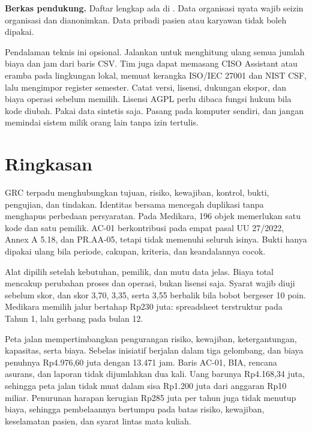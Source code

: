 \textbf{Berkas pendukung.} Daftar lengkap ada di . Data
organisasi nyata wajib seizin organisasi dan dianonimkan. Data pribadi pasien atau karyawan tidak
boleh dipakai.

\begin{pendalaman}
Pendalaman teknis ini opsional. Jalankan  untuk
menghitung ulang semua jumlah biaya dan jam dari baris CSV. Tim juga dapat memasang CISO Assistant
atau eramba pada lingkungan lokal, memuat kerangka ISO/IEC 27001 dan NIST CSF, lalu mengimpor
register semester. Catat versi, lisensi, dukungan ekspor, dan biaya operasi sebelum memilih. Lisensi
AGPL perlu dibaca fungsi hukum bila kode diubah. Pakai data sintetis saja. Pasang pada komputer
sendiri, dan jangan memindai sistem milik orang lain tanpa izin tertulis.
\end{pendalaman}

\section{Ringkasan}

GRC terpadu menghubungkan tujuan, risiko, kewajiban, kontrol, bukti, pengujian, dan tindakan.
Identitas bersama mencegah duplikasi tanpa menghapus perbedaan persyaratan. Pada Medikara, 196 objek
memerlukan satu kode dan satu pemilik. AC-01 berkontribusi pada empat pasal UU 27/2022, Annex A
5.18, dan PR.AA-05, tetapi tidak memenuhi seluruh isinya. Bukti hanya dipakai ulang bila periode,
cakupan, kriteria, dan keandalannya cocok.

Alat dipilih setelah kebutuhan, pemilik, dan mutu data jelas. Biaya total mencakup perubahan proses
dan operasi, bukan lisensi saja. Syarat wajib diuji sebelum skor, dan skor 3,70, 3,35, serta 3,55
berbalik bila bobot bergeser 10 poin. Medikara memilih jalur bertahap Rp230 juta: spreadsheet
terstruktur pada Tahun 1, lalu gerbang pada bulan 12.

Peta jalan mempertimbangkan pengurangan risiko, kewajiban, ketergantungan, kapasitas, serta biaya.
Sebelas inisiatif berjalan dalam tiga gelombang, dan biaya penuhnya Rp4.976,60 juta dengan 13.471
jam. Baris AC-01, BIA, rencana asurans, dan laporan tidak dijumlahkan dua kali. Uang barunya
Rp4.168,34 juta, sehingga peta jalan tidak muat dalam sisa Rp1.200 juta dari anggaran Rp10 miliar.
Penurunan harapan kerugian Rp285 juta per tahun juga tidak menutup biaya, sehingga pembelaannya
bertumpu pada batas risiko, kewajiban, keselamatan pasien, dan syarat lintas mata kuliah.


